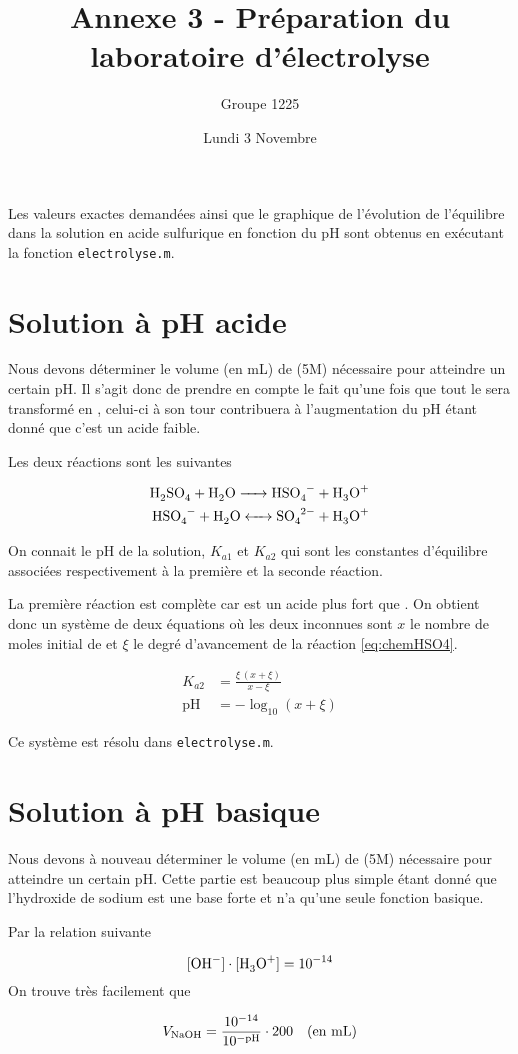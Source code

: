 \documentclass[12pt,oneside]{article}
\title{Annexe 3 - Préparation du laboratoire d'électrolyse}
\author{Groupe 1225}
\date{Lundi 3 Novembre}
\begin{document}
\maketitle

Les valeurs exactes demandées ainsi que le graphique de l'évolution de l'équilibre
dans la solution en acide sulfurique en fonction du pH sont obtenus en
exécutant la fonction \texttt{electrolyse.m}.

\section{Solution à pH acide}

Nous devons déterminer le volume (en \si{\milli\liter}) de  (5M)
nécessaire pour atteindre un certain pH.
Il s'agit donc de prendre en compte le fait qu'une fois que tout 
le  sera transformé en , celui-ci à son tour contribuera
à l'augmentation du pH étant donné que c'est un acide faible.

Les deux réactions sont les suivantes

\begin{align}
	\ce{H2SO4 + H2O -> HSO4- + H3O+} \nonumber \\
	\ce{HSO4- + H2O <-> SO4^{2-} + H3O+} \label{eq:chemHSO4}
\end{align}

On connait le pH de la solution, $K_{a1}$ et $K_{a2}$ qui sont les constantes 
d'équilibre associées respectivement à la première et la seconde réaction.

La première réaction est complète car  est un acide plus fort que .
On obtient donc un système de deux équations où les deux inconnues
sont $x$ le nombre de moles initial de  et $\xi$
le degré d'avancement de la réaction \ref{eq:chemHSO4}.

\begin{align*}
	K_{a2} &= \frac{\xi \, (x + \xi)}{x - \xi} \\
	\text{pH} &= - \log_{10}{(x + \xi)} 
\end{align*}

Ce système est résolu dans \texttt{electrolyse.m}.

\section{Solution à pH basique}

Nous devons à nouveau déterminer le volume (en \si{\milli\liter}) 
de  (5M) nécessaire pour atteindre un certain pH.
Cette partie est beaucoup plus simple étant donné que l'hydroxide de sodium
est une base forte et n'a qu'une seule fonction basique.

Par la relation suivante

\[
	[\ce{OH-}] \cdot [\ce{H3O+}] = 10^{-14} 
\]
On trouve très facilement que 

\[
	V_{\ce{NaOH}} = \frac{10^{-14}}{10^{- \text{pH}}} \cdot 200 
	\quad \text{(en \si{\milli\liter})}
\]
\end{document}
